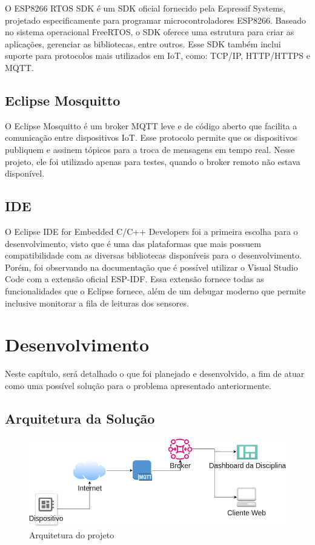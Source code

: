 \documentclass[12pt]{article}
\begin{document}
O ESP8266 RTOS SDK é um SDK oficial fornecido pela Espressif Systems, projetado especificamente para programar microcontroladores ESP8266. Baseado no sistema operacional FreeRTOS, o SDK oferece uma estrutura para criar as aplicações, gerenciar as bibliotecas, entre outros. Esse SDK também inclui suporte para protocolos mais utilizados em IoT, como: TCP/IP, HTTP/HTTPS e MQTT.

\subsection{Eclipse Mosquitto}

O Eclipse Mosquitto é um broker MQTT leve e de código aberto que facilita a comunicação entre dispositivos IoT. Esse protocolo permite que os dispositivos publiquem e assinem tópicos para a troca de mensagens em tempo real. Nesse projeto, ele foi utilizado apenas para testes, quando o broker remoto não estava disponível.

\subsection{IDE}

O Eclipse IDE for Embedded C/C++ Developers foi a primeira escolha para o desenvolvimento, visto que é uma das plataformas que mais possuem compatibilidade com as diversas bibliotecas disponíveis para o desenvolvimento. Porém, foi observando na documentação que é possível utilizar o Visual Studio Code com a extensão oficial ESP-IDF. Essa extensão fornece todas as funcionalidades que o Eclipse fornece, além de um debugar moderno que permite inclusive monitorar a fila de leituras dos sensores.

\section{Desenvolvimento}

Neste capítulo, será detalhado o que foi planejado e desenvolvido, a fim de atuar como uma possível solução para o problema apresentado anteriormente.

\subsection{Arquitetura da Solução}

\begin{figure}[ht]
  \centering
  \includegraphics[width=.7\textwidth]{assets/img/architecture.png}
  \caption{Arquitetura do projeto}
\end{figure}
\end{document}
